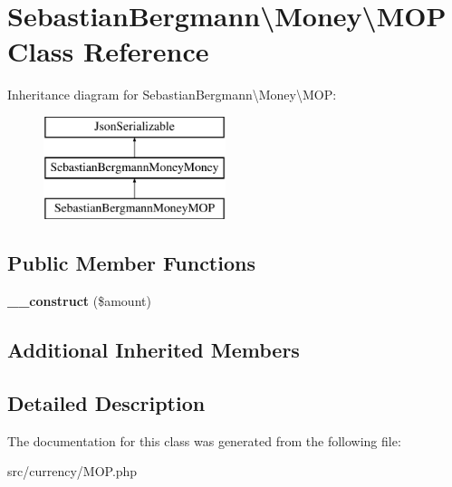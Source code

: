 \hypertarget{classSebastianBergmann_1_1Money_1_1MOP}{}\section{Sebastian\+Bergmann\textbackslash{}Money\textbackslash{}M\+O\+P Class Reference}
\label{classSebastianBergmann_1_1Money_1_1MOP}
Inheritance diagram for Sebastian\+Bergmann\textbackslash{}Money\textbackslash{}M\+O\+P\+:\begin{figure}[H]
\begin{center}
\leavevmode
\includegraphics[height=3.000000cm]{classSebastianBergmann_1_1Money_1_1MOP}
\end{center}
\end{figure}
\subsection*{Public Member Functions}
\begin{DoxyCompactItemize}
\item 
\hypertarget{classSebastianBergmann_1_1Money_1_1MOP_ae5e06b7ade56d6be05b2164078da1b55}{}{\bfseries \+\_\+\+\_\+construct} (\$amount)\label{classSebastianBergmann_1_1Money_1_1MOP_ae5e06b7ade56d6be05b2164078da1b55}

\end{DoxyCompactItemize}
\subsection*{Additional Inherited Members}


\subsection{Detailed Description}


The documentation for this class was generated from the following file\+:\begin{DoxyCompactItemize}
\item 
src/currency/M\+O\+P.\+php\end{DoxyCompactItemize}
